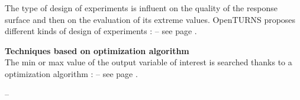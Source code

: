 {  The type of design of experiments  is influent on the quality of the response surface and then on the evaluation of its extreme values. OpenTURNS proposes different kinds of design of experiments  :  -- see page \pageref{docref_C11_ExperimentPlanes}.



  {\bf Techniques based on optimization algorithm}\\

  The min or max value of the output variable of interest is searched thanks to a optimization algorithm :  -- see page \pageref{docref_C11_OptimizationAlgo}.

}
{
  --
}
